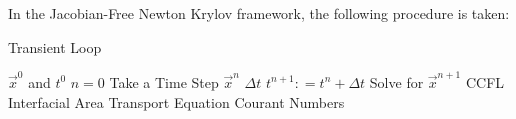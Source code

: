 In the Jacobian-Free Newton Krylov framework, the following procedure is taken:

%
%
%
%
%

\begin{algorithm}
\setlength{\baselineskip}{0.625\baselineskip}
\label{TransientLoop}
\caption{Transient Loop}
\begin{algorithmic}[1]
\Require $\Vec{x}^{0}$ and $t^{0}$
\Set $n = 0$
\Loop \; Take a Time Step
    \Set $\vec{x}^{n}$        
    \Calculate $\Delta t$ 
    \State $t^{n+1} : = t^{n} + \Delta t$
    \BlackBox Solve for $\vec{x}^{n+1}$ 
    \Test CCFL 
    \BlackBox Interfacial Area Transport Equation
    \Calculate Courant Numbers 
\end{algorithmic}
\end{algorithm}

